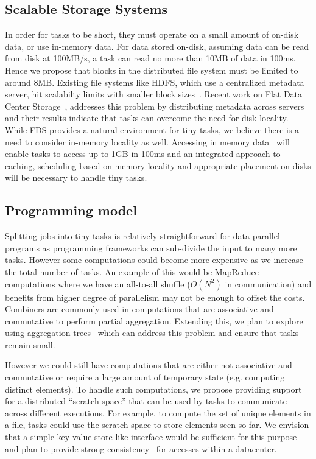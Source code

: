 \subsection{Scalable Storage Systems}
In order for tasks to be short, they must operate on a small amount of on-disk
data, or use in-memory data.  For data stored on-disk, assuming data can be read
from disk at 100MB/s, a task can read no more than 10MB of data in 100ms.  Hence
we propose that blocks in the distributed file system must be limited to around
8MB. Existing file systems like HDFS, which use a centralized metadata server,
hit scalabilty limits with smaller block sizes~\cite{facebook-berkeley-talk}.
Recent work on Flat Data Center Storage~\cite{fds}, addresses this problem by
distributing metadata across servers and their results indicate that tasks can
overcome the need for disk locality. While FDS provides a natural environment
for tiny tasks, we believe there is a need to consider in-memory locality as
well. Accessing in memory data~\cite{pacman, spark} will enable tasks to access 
up to 1GB in 100ms and an integrated approach to caching, scheduling based on
memory locality and appropriate placement on disks will be necessary to handle
tiny tasks.

\subsection{Programming model}
\label{sec:prog}
Splitting jobs into tiny tasks is relatively straightforward for data parallel
programs as programming frameworks can sub-divide the input to many more tasks.
However some computations could become more expensive as we increase the total
number of tasks. An example of this would be MapReduce computations where we
have an all-to-all shuffle ($O(N^2)$ in communication) and benefits from higher
degree of parallelism may not be enough to offset the costs.
Combiners are commonly used in computations that are
associative and commutative to perform partial aggregation.
Extending this, we plan to explore using
aggregation trees~\cite{something} which can address this problem and ensure
that tasks remain small.

However we could still have computations that are either not associative and
commutative or require a large amount of temporary state (e.g. computing
distinct elements). To handle such computations, we propose providing 
support for a distributed ``scratch space'' that can be used by tasks to 
communicate across different executions. For example, to compute the set of
unique elements in a file, tasks could use the scratch space to store elements
seen so far. We envision that a simple key-value store like interface would
be sufficient for this purpose and plan to provide strong 
consistency~\cite{something} for accesses within a datacenter. 

